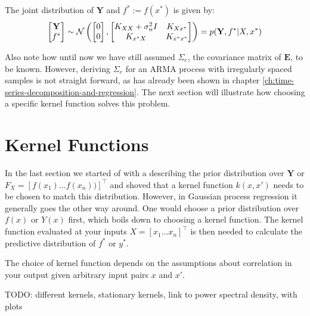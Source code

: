 The joint distribution of $\mathbf{Y}$ and $f^{\ast} := f(x^{\ast})$ is given by:
\begin{gather}
    \begin{bmatrix}
        \mathbf{Y} \\
        f^{\ast}
    \end{bmatrix}
    \sim \operatorname{\mathcal{N}} \left(
        \begin{bmatrix}
        0 \\
        0
        \end{bmatrix},
        \begin{bmatrix}
        K_{XX} + \sigma_n^2 I & K_{Xx^{\ast}} \\
        K_{x^{\ast}X} & K_{x^{\ast}x^{\ast}}
        \end{bmatrix}
        \right)
    = p(\mathbf{Y}, f^{\ast}| X, x^{\ast})
\end{gather}


Also note how until now we have still assumed $\Sigma_e$, the covariance matrix of $\mathbf{E}$, to be known.
However, deriving $\Sigma_e$ for an ARMA process with irregularly spaced samples is not straight forward, as has already
been shown in chapter \ref{ch:time-series-decomposition-and-regression}.
The next section will illustrate how choosing a specific kernel function solves this problem.

\section{Kernel Functions}\label{subsec:kernel}

In the last section we started of with a describing the prior distribution over
$\mathbf{Y}$ or $F_X = [f(x_1) \dots f(x_n))]^{\top}$ and shoved that a kernel function $k(x, x')$ needs to be
chosen to match this distribution.
However, in Gaussian process regression it generally goes the other way around.
One would choose a prior distribution over $f(x)$ or $Y(x)$ first, which boils down to choosing a kernel function.
The kernel function evaluated at your inputs $X=[x_1 \dots x_n]^{\top}$ is then needed to calculate the
predictive distribution of $f^{\ast}$ or $y^{\ast}$.

The choice of kernel function depends on the assumptions about correlation in your output given arbitrary input pairs
$x$ and $x'$.




TODO: different kernels, stationary kernels, link to power spectral density, with plots


